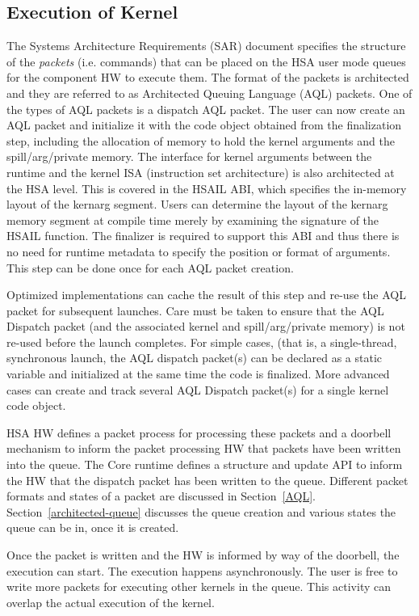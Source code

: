 \documentclass[final]{book}
\begin{document}
\subsection{Execution of Kernel}
The Systems Architecture Requirements (SAR) document specifies the structure of
the \emph{packets} (i.e. commands) that can be placed on the HSA user mode
queues for the component HW to execute them. The format of the packets is
architected and they are referred to as Architected Queuing Language (AQL)
packets. One of the types of AQL packets is a dispatch AQL packet. The user can
now create an AQL packet and initialize it with the code object obtained from
the finalization step, including the allocation of memory to hold the kernel
arguments and the spill/arg/private memory. The interface for kernel arguments
between the runtime and the kernel ISA (instruction set architecture) is also
architected at the HSA level. This is covered in the HSAIL ABI, which specifies
the in-memory layout of the kernarg segment. Users can determine the layout of
the kernarg memory segment at compile time merely by examining the signature of
the HSAIL function. The finalizer is required to support this ABI and thus there
is no need for runtime metadata to specify the position or format of arguments.
This step can be done once for each AQL packet creation.

Optimized implementations can cache the result of this step and re-use the AQL
packet for subsequent launches. Care must be taken to ensure that the AQL
Dispatch packet (and the associated kernel and spill/arg/private memory) is not
re-used before the launch completes. For simple cases, (that is, a
single-thread, synchronous launch, the AQL dispatch packet(s) can be declared
as a static variable and initialized at the same time the code is
finalized. More advanced cases can create and track several AQL Dispatch
packet(s) for a single kernel code object.

HSA HW defines a packet process for processing these packets and a doorbell
mechanism to inform the packet processing HW that packets have been written into
the queue. The Core runtime defines a structure and update API to inform the HW
that the dispatch packet has been written to the queue. Different packet formats
and states of a packet are discussed in
Section~\ref{AQL}. Section~\ref{architected-queue} discusses the queue creation
and various states the queue can be in, once it is created.

Once the packet is written and the HW is informed by way of the doorbell, the
execution can start. The execution happens asynchronously. The user is free to
write more packets for executing other kernels in the queue. This activity can
overlap the actual execution of the kernel.
\end{document}
